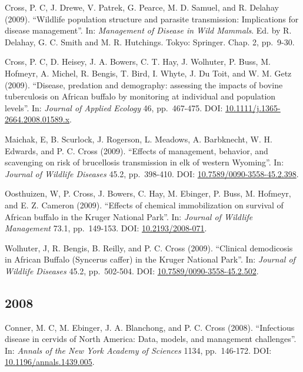 \documentclass[12pt,]{article}
\begin{document}
Cross, P. C, J. Drewe, V. Patrek, G. Pearce, M. D. Samuel, and R.
Delahay (2009). ``Wildlife population structure and parasite
transmission: Implications for disease management''. In:
\emph{Management of Disease in Wild Mammals}. Ed. by R. Delahay, G. C.
Smith and M. R. Hutchings. Tokyo: Springer. Chap. 2, pp.~9-30.

Cross, P. C, D. Heisey, J. A. Bowers, C. T. Hay, J. Wolhuter, P. Buss,
M. Hofmeyr, A. Michel, R. Bengis, T. Bird, I. Whyte, J. Du Toit, and W.
M. Getz (2009). ``Disease, predation and demography: assessing the
impacts of bovine tuberculosis on African buffalo by monitoring at
individual and population levels''. In: \emph{Journal of Applied
Ecology} 46, pp.~467-475. DOI:
\href{https://doi.org/10.1111\%2Fj.1365-2664.2008.01589.x}{10.1111/j.1365-2664.2008.01589.x}.

Maichak, E, B. Scurlock, J. Rogerson, L. Meadows, A. Barbknecht, W. H.
Edwards, and P. C. Cross (2009). ``Effects of management, behavior, and
scavenging on risk of brucellosis transmission in elk of western
Wyoming''. In: \emph{Journal of Wildlife Diseases} 45.2, pp.~398-410.
DOI:
\href{https://doi.org/10.7589\%2F0090-3558-45.2.398}{10.7589/0090-3558-45.2.398}.

Oosthuizen, W, P. Cross, J. Bowers, C. Hay, M. Ebinger, P. Buss, M.
Hofmeyr, and E. Z. Cameron (2009). ``Effects of chemical immobilization
on survival of African buffalo in the Kruger National Park''. In:
\emph{Journal of Wildlife Management} 73.1, pp.~149-153. DOI:
\href{https://doi.org/10.2193\%2F2008-071}{10.2193/2008-071}.

Wolhuter, J, R. Bengis, B. Reilly, and P. C. Cross (2009). ``Clinical
demodicosis in African Buffalo (Syncerus caffer) in the Kruger National
Park''. In: \emph{Journal of Wildlife Diseases} 45.2, pp.~502-504. DOI:
\href{https://doi.org/10.7589\%2F0090-3558-45.2.502}{10.7589/0090-3558-45.2.502}.

\hypertarget{section-11}{%
\subsection{2008}\label{section-11}}

Conner, M. C, M. Ebinger, J. A. Blanchong, and P. C. Cross (2008).
``Infectious disease in cervids of North America: Data, models, and
management challenges''. In: \emph{Annals of the New York Academy of
Sciences} 1134, pp.~146-172. DOI:
\href{https://doi.org/10.1196\%2Fannals.1439.005}{10.1196/annals.1439.005}.
\end{document}

